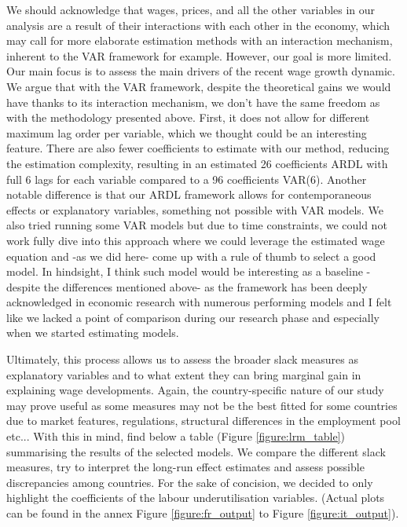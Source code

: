 We should acknowledge that wages, prices, and all the other variables in our analysis are a result of their interactions with each other in the economy, which may call for more elaborate estimation methods with an interaction mechanism, inherent to the VAR framework for example. However, our goal is more limited. 
Our main focus is to assess the main drivers of the recent wage growth dynamic. 
We argue that with the VAR framework, despite the theoretical gains we would have thanks to its interaction mechanism, we don’t have the same freedom as with the methodology presented above. 
First, it does not allow for different maximum lag order per variable, which we thought could be an interesting feature. 
There are also fewer coefficients to estimate with our method, reducing the estimation complexity, resulting in an estimated 26 coefficients ARDL with full 6 lags for each variable compared to a 96 coefficients VAR(6). 
Another notable difference is that our ARDL framework allows for contemporaneous effects or explanatory variables, something not possible with VAR models. 
We also tried running some VAR models but due to time constraints, we could not work fully dive into this approach where we could leverage the estimated wage equation and -as we did here- come up with a rule of thumb to select a good model. 
In hindsight, I think such model would be interesting as a baseline -despite the differences mentioned above- as the framework has been deeply acknowledged in economic research with numerous performing models  and I felt like we lacked a point of comparison during our research phase and especially when we started estimating models.

Ultimately, this process allows us to assess the broader slack measures as explanatory variables and to what extent they can bring marginal gain in explaining wage developments. 
Again, the country-specific nature of our study may prove useful as some measures may not be the best fitted for some countries due to market features, regulations, structural differences in the employment pool etc... 
With this in mind, find below a table (Figure \ref{figure:lrm_table}) summarising the results of the selected models. 
We compare the different slack measures, try to interpret the long-run effect estimates and assess possible discrepancies among countries. 
For the sake of concision, we decided to only highlight the coefficients of the labour underutilisation variables. (Actual plots can be found in the annex Figure \ref{figure:fr_output} to Figure \ref{figure:it_output}).

